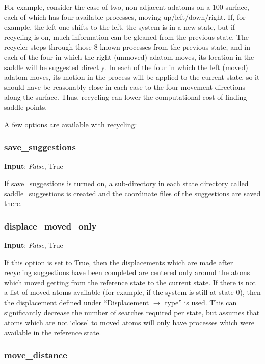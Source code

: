 \documentclass{article}
\begin{document}
For example, consider the case of two, non-adjacent adatoms on a 100 surface, each of which has four available processes, moving up/left/down/right.  If, for example, the left one shifts to the left, the system is in a new state, but if recycling is on, much information can be gleaned from the previous state.  The recycler steps through those 8 known processes from the previous state, and in each of the four in which the right (unmoved) adatom moves, its location in the saddle will be suggested directly.  In each of the four in which the left (moved) adatom moves, its motion in the process will be applied to the current state, so it should have be reasonably close in each case to the four movement directions along the surface.  Thus, recycling can lower the computational cost of finding saddle points.

A few options are available with recycling:

\subsubsection{save\_suggestions}

\noindent\textbf{Input}:  \emph{False}, True

If save\_suggestions is turned on, a sub-directory in each state directory called saddle\_suggestions is created and the coordinate files of the suggestions are saved there.

\subsubsection{displace\_moved\_only}

\noindent\textbf{Input}:  \emph{False}, True

If this option is set to True, then the displacements which are made after recycling suggestions have been completed are centered only around the atoms which moved getting from the reference state to the current state.  If there is not a list of moved atoms available (for example, if the system is still at state 0), then the displacement defined under ``Displacement $\to$ type'' is used.  This can significantly decrease the number of searches required per state, but assumes that atoms which are not `close' to moved atoms will only have processes which were available in the reference state.

\subsubsection{move\_distance}
\end{document}
